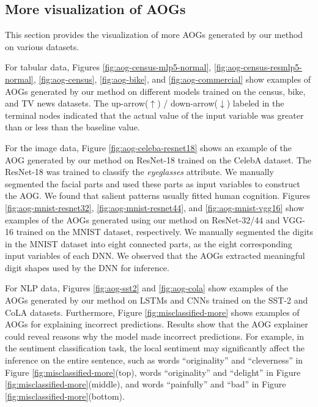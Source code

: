 \begin{table}[h]
\caption{Classification accuracy of models trained on the MNIST dataset.}
\label{tab:app-acc-mnist}
\centering
{}
\end{table}


\subsection{More visualization of AOGs}
\label{sec:app-more-aog}


This section provides the visualization of more AOGs generated by our method on various datasets.

For tabular data, Figures \ref{fig:aog-census-mlp5-normal}, \ref{fig:aog-census-resmlp5-normal},  \ref{fig:aog-census}, \ref{fig:aog-bike}, and \ref{fig:aog-commercial} show examples of AOGs generated by our method on different models trained on the census, bike, and TV news datasets.
The up-arrow({\small$\uparrow$}) / down-arrow({\small$\downarrow$}) labeled in the terminal nodes indicated that the actual value of the input variable was greater than or less than the baseline value.

For the image data, Figure \ref{fig:aog-celeba-resnet18} shows an example of the AOG generated by our method on ResNet-18 trained on the CelebA dataset. The ResNet-18 was trained to classify the \textit{eyeglasses} attribute.  We manually segmented the facial parts and used these parts as input variables to construct the AOG.
We found that salient patterns usually fitted human cognition.
Figures \ref{fig:aog-mnist-resnet32}, \ref{fig:aog-mnist-resnet44}, and \ref{fig:aog-mnist-vgg16} show examples of the  AOGs generated using our method on ResNet-32/44 and VGG-16 trained on the MNIST dataset, respectively.
We manually segmented the digits in the MNIST dataset into eight connected parts, as the eight corresponding input variables of each DNN.
We observed that the AOGs extracted meaningful digit shapes used by the DNN for inference.




For NLP data, Figures \ref{fig:aog-sst2} and \ref{fig:aog-cola} show examples of the AOGs generated by our method on LSTMs and CNNs trained on the SST-2 and CoLA datasets.
Furthermore, Figure \ref{fig:misclassified-more} shows examples of AOGs for explaining incorrect predictions. Results show that the AOG explainer could reveal reasons why the model made incorrect predictions.
For example, in the sentiment classification task, the local sentiment may significantly affect the inference on the entire sentence, such as words ``originality'' and ``cleverness'' in Figure \ref{fig:misclassified-more}(top), words ``originality'' and ``delight'' in Figure \ref{fig:misclassified-more}(middle),  and words ``painfully'' and ``bad'' in Figure \ref{fig:misclassified-more}(bottom).


